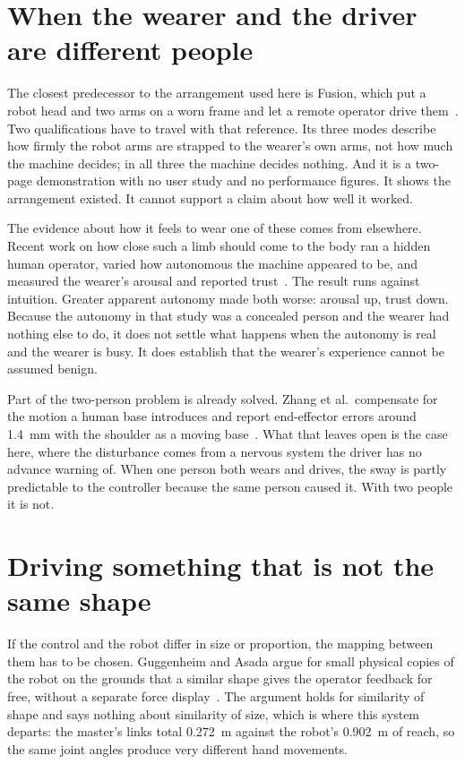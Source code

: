 \section{When the wearer and the driver are different people}

The closest predecessor to the arrangement used here is Fusion, which put a
robot head and two arms on a worn frame and let a remote operator drive
them~\cite{saraiji2018fusion}. Two qualifications have to travel with that
reference. Its three modes describe how firmly the robot arms are strapped to
the wearer's own arms, not how much the machine decides; in all three the
machine decides nothing. And it is a two-page demonstration with no user study
and no performance figures. It shows the arrangement existed. It cannot
support a claim about how well it worked.

The evidence about how it feels to wear one of these comes from elsewhere.
Recent work on how close such a limb should come to the body ran a hidden
human operator, varied how autonomous the machine appeared to be, and measured
the wearer's arousal and reported trust~\cite{zhou2026proxemics}. The result
runs against intuition. Greater apparent autonomy made both worse: arousal up,
trust down. Because the autonomy in that study was a concealed person and the
wearer had nothing else to do, it does not settle what happens when the
autonomy is real and the wearer is busy. It does establish that the wearer's
experience cannot be assumed benign.

Part of the two-person problem is already solved. Zhang et al.\ compensate for
the motion a human base introduces and report end-effector errors around
\SI{1.4}{\milli\metre} with the shoulder as a moving
base~\cite{zhang2024motioncomp}. What that leaves open is the case here, where
the disturbance comes from a nervous system the driver has no advance warning
of. When one person both wears and drives, the sway is partly predictable to
the controller because the same person caused it. With two people it is not.

\section{Driving something that is not the same shape}

If the control and the robot differ in size or proportion, the mapping between
them has to be chosen. Guggenheim and Asada argue for small physical copies of
the robot on the grounds that a similar shape gives the operator feedback for
free, without a separate force display~\cite{guggenheim2021haptic}. The
argument holds for similarity of shape and says nothing about similarity of
size, which is where this system departs: the master's links total
\SI{0.272}{\metre} against the robot's \SI{0.902}{\metre} of reach, so the
same joint angles produce very different hand movements.

